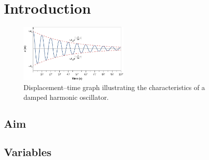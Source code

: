 \section{Introduction}

\begin{figure}
    \centering
    \includegraphics[width=0.48\textwidth]{images/damped_shm.png}
    \caption{Displacement–time graph illustrating the characteristics of a damped harmonic oscillator.}
\end{figure}

\subsection{Aim}
\lipsum[1-2]

\subsection{Variables}
\lipsum[2]

